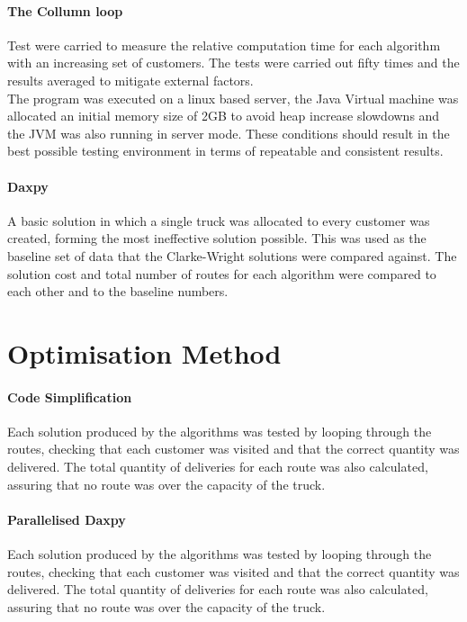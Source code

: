 \documentclass[conference]{acmsiggraph}
\begin{document}
\paragraph{The Collumn loop}
Test were carried to measure the relative computation time for each algorithm with an increasing set of customers. The tests were carried out fifty times and the results averaged to mitigate external factors.\\
The program was executed on a linux based server, the Java Virtual machine was allocated an initial memory size of 2GB to avoid heap increase slowdowns and the JVM was also running in server mode. These conditions should result in the best possible testing environment in terms of  repeatable and consistent results.

\paragraph{Daxpy}
A basic solution in which a single truck was allocated to every customer was created, forming the most ineffective solution possible. This was used as the baseline set of data that the Clarke-Wright solutions were compared against. The solution cost and total number of routes for each algorithm were compared to each other and to the baseline numbers.

\section{Optimisation Method}

\paragraph{Code Simplification}
Each solution produced by the algorithms was tested by looping through the routes, checking that each customer was visited and that the correct quantity was delivered. The total quantity of deliveries for each route was also calculated, assuring that no route was over the capacity of the truck.

\paragraph{Parallelised Daxpy}
Each solution produced by the algorithms was tested by looping through the routes, checking that each customer was visited and that the correct quantity was delivered. The total quantity of deliveries for each route was also calculated, assuring that no route was over the capacity of the truck.
\end{document}
